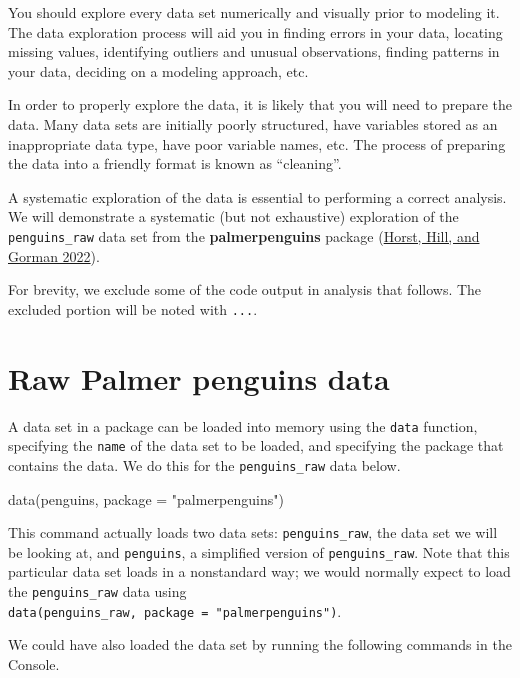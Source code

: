 \documentclass[
]{book}
\newenvironment{Shaded}{\begin{snugshade}}{\end{snugshade}}
\newcommand{\AttributeTok}[1]{\textcolor[rgb]{0.77,0.63,0.00}{#1}}
\newcommand{\FunctionTok}[1]{\textcolor[rgb]{0.00,0.00,0.00}{#1}}
\newcommand{\NormalTok}[1]{#1}
\newcommand{\StringTok}[1]{\textcolor[rgb]{0.31,0.60,0.02}{#1}}
\theoremstyle{definition}
\theoremstyle{definition}
\theoremstyle{definition}
\theoremstyle{definition}
\theoremstyle{remark}
\begin{document}
You should explore every data set numerically and visually prior to modeling it. The data exploration process will aid you in finding errors in your data, locating missing values, identifying outliers and unusual observations, finding patterns in your data, deciding on a modeling approach, etc.

In order to properly explore the data, it is likely that you will need to prepare the data. Many data sets are initially poorly structured, have variables stored as an inappropriate data type, have poor variable names, etc. The process of preparing the data into a friendly format is known as ``cleaning''.

A systematic exploration of the data is essential to performing a correct analysis. We will demonstrate a systematic (but not exhaustive) exploration of the \texttt{penguins\_raw} data set from the \textbf{palmerpenguins} package (\protect\hyperlink{ref-R-palmerpenguins}{Horst, Hill, and Gorman 2022}).

For brevity, we exclude some of the code output in analysis that follows. The excluded portion will be noted with \texttt{...}.

\hypertarget{raw-palmer-penguins-data}{%
\section{Raw Palmer penguins data}\label{raw-palmer-penguins-data}}

A data set in a package can be loaded into memory using the \texttt{data} function, specifying the \texttt{name} of the data set to be loaded, and specifying the package that contains the data. We do this for the \texttt{penguins\_raw} data below.

\begin{Shaded}
\begin{Highlighting}[]
\FunctionTok{data}\NormalTok{(penguins, }\AttributeTok{package =} \StringTok{"palmerpenguins"}\NormalTok{)}
\end{Highlighting}
\end{Shaded}

This command actually loads two data sets: \texttt{penguins\_raw}, the data set we will be looking at, and \texttt{penguins}, a simplified version of \texttt{penguins\_raw}. Note that this particular data set loads in a nonstandard way; we would normally expect to load the \texttt{penguins\_raw} data using \texttt{data(penguins\_raw,\ package\ =\ "palmerpenguins")}.

We could have also loaded the data set by running the following commands in the Console.
\end{document}
